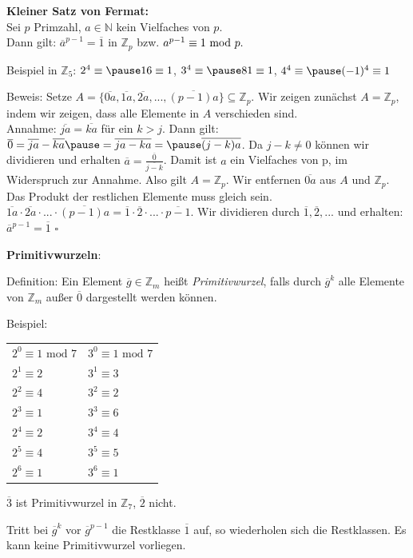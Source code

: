 \begin{frame}[fragile]
\textbf{Kleiner Satz von Fermat:} \\
Sei $p$ Primzahl, $a \in \mathbb{N}$ kein Vielfaches von $p$. \\
Dann gilt: $\overline{a}^{p-1} = \overline{1}$ in $\mathbb{Z}_p$ \quad bzw. $a^{p-1}\equiv1\text{ mod }p.$  \pause

Beispiel in  $\mathbb{Z}_5$: 
$2^4 \equiv \pause 16 \equiv 1$, \quad $3^4 \equiv \pause  81 \equiv 1$, \quad $4^4  \equiv \pause (-1)^4 \equiv 1$ \pause

Beweis: Setze $A = \{\overline{0a}, \overline{1a}, \overline{2a},...,\overline{(p-1)a}\} \subseteq \mathbb{Z}_p$. \pause
Wir zeigen zunächst $A = \mathbb{Z}_p$, indem wir zeigen, dass alle Elemente in $A$ verschieden sind. \\ \pause
Annahme: $\overline{ja} = \overline{ka}$ für ein $k >j$. \pause Dann gilt: $\overline{0}=\overline{ja}-\overline{ka} \pause = \overline{ja-ka} = \pause \overline{(j-k)a}$. \pause Da $j-k \neq 0$ können wir dividieren und erhalten $\overline{a}= \frac{\overline{0}}{\overline{j-k}}$. \pause Damit ist $a$ ein Vielfaches von p, im Widerspruch zur Annahme. \pause Also gilt $A = \mathbb{Z}_p$.
\pause Wir entfernen $\overline{0a}$ aus $A$ und $\mathbb{Z}_p$. \pause Das Produkt der restlichen Elemente muss gleich sein. \pause $\overline{1a} \cdot \overline{2a} \cdot ... \cdot \overline{(p-1)a} = \overline{1} \cdot \overline{2} \cdot ... \cdot \overline{p-1}$. \pause
Wir dividieren durch $\overline{1}, \overline{2}, ...$ und erhalten: \quad $\overline{a}^{p-1} = \overline{1}$ \pause \hfill $\square{}$
\end{frame} 

\begin{frame}[fragile]
\textbf{Primitivwurzeln}: 

Definition: Ein Element $\overline{g} \in  \mathbb{Z}_m$ heißt \textit{Primitivwurzel}, falls durch $\overline{g}^k$ alle Elemente von $\mathbb{Z}_m$ außer
$\overline{0}$ dargestellt werden können. \pause

Beispiel:

\begin{tabular}{ll}
$2^0 \equiv 1 \text{ mod } 7$ &\quad $3^0 \equiv 1 \text{ mod } 7$ \\
$2^1 \equiv 2  $ &\quad $3^1 \equiv 3$ \\
$2^2 \equiv 4  $ &\quad $3^2 \equiv 2$ \\
$2^3 \equiv 1  $ &\quad $3^3 \equiv 6$ \\
$2^4 \equiv 2  $ &\quad $3^4 \equiv 4$ \\
$2^5 \equiv 4  $ &\quad $3^5 \equiv 5$ \\
$2^6 \equiv 1  $ &\quad $3^6 \equiv 1$ 
\end{tabular} \pause

$\overline{3}$ ist Primitivwurzel in $ \mathbb{Z}_7$,  $\overline{2}$ nicht. \pause

Tritt bei $\overline{g}^k$ vor $\overline{g}^{p-1}$ die Restklasse $\overline{1}$ auf, so wiederholen sich die Restklassen. Es kann keine Primitivwurzel vorliegen.
\end{frame}
 
